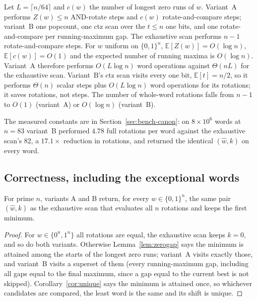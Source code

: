 \begin{proposition}[Cost]
\label{prop:cost}
Let $L=\lceil n/64\rceil$ and $c(w)$ the number of longest zero runs
of $w$. Variant~A performs $Z(w)\le n$ AND-rotate steps and $c(w)$
rotate-and-compare steps; variant~B one popcount, one ctz scan over
the $t\le n$ one bits, and one rotate-and-compare per running-maximum
gap. The exhaustive scan performs $n-1$ rotate-and-compare steps. For
$w$ uniform on $\{0,1\}^n$, $\mathbb E[Z(w)]=O(\log n)$,
$\mathbb E[c(w)]=O(1)$ and the expected number of running maxima is
$O(\log n)$. Variant~A therefore performs $O(L\log n)$ word
operations against $\Theta(nL)$ for the exhaustive scan. Variant~B's
ctz scan visits every one bit, $\mathbb E[t]=n/2$, so it performs
$\Theta(n)$ scalar steps plus $O(L\log n)$ word operations for its
rotations; it saves rotations, not steps. The number of whole-word
rotations falls from $n-1$ to $O(1)$ (variant~A) or $O(\log n)$
(variant~B).
\end{proposition}

The measured constants are in Section~\ref{sec:bench-canon}: on
$8\times10^6$ words at $n=83$ variant~B performed $4.78$ full
rotations per word against the exhaustive scan's $82$, a $17.1\times$
reduction in rotations, and returned the identical $(\hat w,k)$ on
every word.

\subsection{Correctness, including the exceptional words}
\label{sec:canon-correctness}

\begin{theorem}
\label{thm:canon}
For prime $n$, variants A and B return, for every $w\in\{0,1\}^n$,
the same pair $(\hat w,k)$ as the exhaustive scan that evaluates all
$n$ rotations and keeps the first minimum.
\end{theorem}
\begin{proof}
For $w\in\{0^n,1^n\}$ all rotations are equal, the exhaustive scan
keeps $k=0$, and so do both variants. Otherwise
Lemma~\ref{lem:zerogap} says the minimum is attained among the starts
of the longest zero runs; variant~A visits exactly those, and
variant~B visits a superset of them (every running-maximum gap,
including all gaps equal to the final maximum, since a gap equal to
the current best is not skipped). Corollary~\ref{cor:unique} says the
minimum is attained once, so whichever candidates are compared, the
least word is the same and its shift is unique.
\end{proof}

